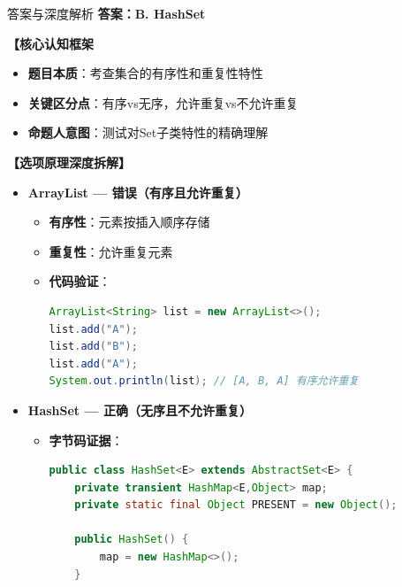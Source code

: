 \documentclass[12pt, a4paper]{ctexart}
\begin{document}
\begin{enumerate}[label=\textbf{\arabic*.}]
	      \begin{bluebox}{答案与深度解析}
		      \textbf{答案：B. HashSet}

		      \textbf{【核心认知框架}
		      \begin{itemize}[label={}, leftmargin=*, nosep]
			      \item \textbf{题目本质}：考查集合的有序性和重复性特性
			      \item \textbf{关键区分点}：有序vs无序，允许重复vs不允许重复
			      \item \textbf{命题人意图}：测试对Set子类特性的精确理解
		      \end{itemize}

		      \textbf{【选项原理深度拆解】}

		      \begin{itemize}[leftmargin=*, nosep, label={}]
			      \item[A] \textbf{ArrayList — 错误（有序且允许重复）}
			            \begin{itemize}[label={}, leftmargin=*, nosep]
				            \item \textbf{有序性}：元素按插入顺序存储
				            \item \textbf{重复性}：允许重复元素
				            \item \textbf{代码验证}：
				                  \begin{lstlisting}[language=Java]
ArrayList<String> list = new ArrayList<>();
list.add("A");
list.add("B");
list.add("A");
System.out.println(list); // [A, B, A] 有序允许重复
				      \end{lstlisting}
			            \end{itemize}

			      \item[B] \textbf{HashSet — 正确（无序且不允许重复）}
			            \begin{itemize}[label={}, leftmargin=*, nosep]
				            \item \textbf{字节码证据}：
				                  \begin{lstlisting}[language=Java]
public class HashSet<E> extends AbstractSet<E> {
    private transient HashMap<E,Object> map;
    private static final Object PRESENT = new Object();

    public HashSet() {
        map = new HashMap<>();
    }


\end{lstlisting}
\end{itemize}
\end{itemize}
\end{bluebox}
\end{enumerate}
\end{document}
